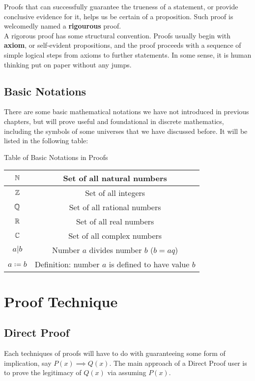 Proofs that can successfully guarantee the trueness of a statement, or provide conclusive evidence for it, helps us be certain of a proposition. Such proof is welcomedly named a \textbf{rigourous} proof. \\
A rigorous proof has some structural convention. Proofs usually begin with \textbf{axiom}, or self-evident propositions, and the proof proceeds with a sequence of simple logical steps from axioms to further statements. In some sense, it is human thinking put on paper without any jumps. \\

\subsection{Basic Notations}
There are some basic mathematical notations we have not introduced in previous chapters, but will prove useful and foundational in discrete mathematics, including the symbols of some universes that we have discussed before. It will be listed in the following table:
\begin{ln-symbol}{Table of Basic Notations in Proofs}{}
    \begin{center}
        \begin{tabular}{|c|c|}
            \hline
            $\mathbb{N}$ & Set of all natural numbers \\
            \hline
            $\mathbb{Z}$ & Set of all integers \\
            \hline
            $\mathbb{Q}$ & Set of all rational numbers \\
            \hline
            $\mathbb{R}$ & Set of all real numbers \\
            \hline
            $\mathbb{C}$ & Set of all complex numbers \\
            \hline
            $a|b$ & Number $a$ divides number $b$ ($b = aq$) \\
            \hline
            $a \coloneqq b$ & Definition: number $a$ is defined to have value $b$ \\
            \hline
        \end{tabular}
    \end{center}
\end{ln-symbol}

\section{Proof Technique}

\subsection{Direct Proof}
Each techniques of proofs will have to do with guaranteeing some form of implication, say $P(x) \implies Q(x)$. The main approach of a Direct Proof user is to prove the legitimacy of $Q(x)$ via assuming $P(x)$. \\

